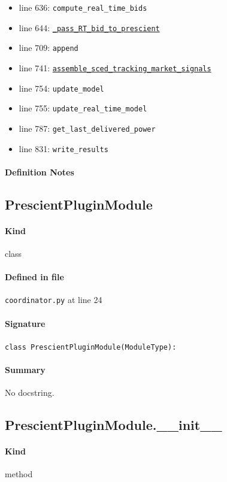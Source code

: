 \documentclass[11pt]{report}
\begin{document}
\begin{itemize}[leftmargin=*]
  \item line 636: \texttt{compute\_real\_time\_bids}
  \item line 644: \hyperref[def:coordinator.py:DoubleLoopCoordinator._pass_RT_bid_to_prescient:L587]{\texttt{\_pass\_RT\_bid\_to\_prescient}}
  \item line 709: \texttt{append}
  \item line 741: \hyperref[def:coordinator.py:DoubleLoopCoordinator.assemble_sced_tracking_market_signals:L648]{\texttt{assemble\_sced\_tracking\_market\_signals}}
  \item line 754: \texttt{update\_model}
  \item line 755: \texttt{update\_real\_time\_model}
  \item line 787: \texttt{get\_last\_delivered\_power}
  \item line 831: \texttt{write\_results}
\end{itemize}
\paragraph{Definition Notes}
\subsection{PrescientPluginModule}
\label{def:coordinator.py:PrescientPluginModule:L24}
\paragraph{Kind} class
\paragraph{Defined in file} \texttt{coordinator.py} at line 24
\paragraph{Signature} \texttt{class PrescientPluginModule(ModuleType):}
\paragraph{Summary} No docstring.
\subsection{PrescientPluginModule.\_\_init\_\_}
\label{def:coordinator.py:PrescientPluginModule.__init__:L25}
\paragraph{Kind} method
\end{document}
